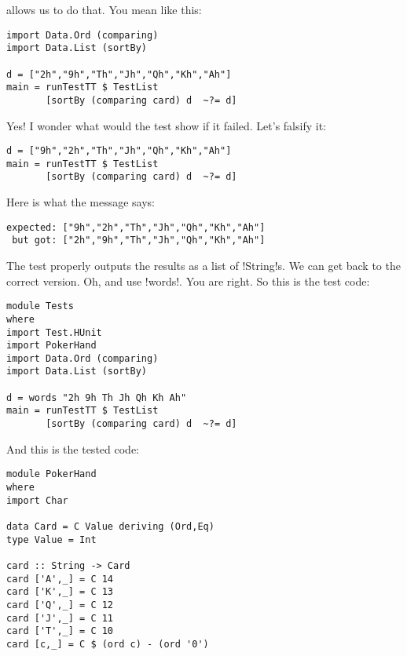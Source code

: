 allows us to do that.
\lhN You mean like this:
\begin{lstlisting}[frame=single]
import Data.Ord (comparing)
import Data.List (sortBy)

d = ["2h","9h","Th","Jh","Qh","Kh","Ah"]
main = runTestTT $ TestList 
       [sortBy (comparing card) d  ~?= d]
\end{lstlisting} %
\hspace*{\fill}
\lhA \success Yes!
\lhN I wonder what would the test show if it failed. Let's falsify it:
\begin{lstlisting}[frame=single]
d = ["9h","2h","Th","Jh","Qh","Kh","Ah"]
main = runTestTT $ TestList 
       [sortBy (comparing card) d  ~?= d]
\end{lstlisting} %
\hspace*{\fill}
\lhA \failure Here is what the message says:
\begin{small}
\begin{verbatim}
expected: ["9h","2h","Th","Jh","Qh","Kh","Ah"]
 but got: ["2h","9h","Th","Jh","Qh","Kh","Ah"]
\end{verbatim}
\end{small}
The test properly outputs the results as a list of \il!String!s. We can get back to the correct version. Oh, and use \il!words!.
\lhN You are right. So this is the test code:
\begin{lstlisting}[frame=single]
module Tests
where 
import Test.HUnit
import PokerHand
import Data.Ord (comparing)
import Data.List (sortBy)

d = words "2h 9h Th Jh Qh Kh Ah"
main = runTestTT $ TestList 
       [sortBy (comparing card) d  ~?= d]
\end{lstlisting} %
\hspace*{\fill}
\lhA And this is the tested code:
\begin{lstlisting}[frame=single]
module PokerHand
where
import Char

data Card = C Value deriving (Ord,Eq)
type Value = Int

card :: String -> Card
card ['A',_] = C 14
card ['K',_] = C 13
card ['Q',_] = C 12
card ['J',_] = C 11
card ['T',_] = C 10
card [c,_] = C $ (ord c) - (ord '0')
\end{lstlisting}
\lhend
